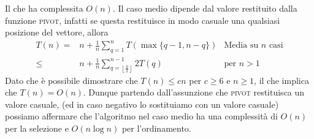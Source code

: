         Il che ha complessita $O(n)$. Il caso medio dipende dal valore restituito dalla funzione \textsc{pivot}, infatti se questa restituisce in modo casuale una qualsiasi posizione del vettore, allora
        \begin{align*}
            T(n) =& n + \frac1n\sum_{q=1}^n T(\max\{q-1,n-q\}) &\text{Media su } n \text{ casi}\\
            \leq & n + \frac1n\sum_{q=\left\lfloor \frac{n}2 \right\rfloor}^{n-1} 2T(q)  &\text{per } n>1
        \end{align*}
        Dato che è possibile dimostrare che $T(n) \leq cn$ per $c\geq 6$ e $n\geq 1$, il che implica che $T(n) = O(n)$.\newline
        Dunque partendo dall'assunzione che \textsc{pivot} restituisca un valore casuale, (ed in caso negativo lo sostituiamo con un valore casuale) possiamo affermare che l'algoritmo nel caso medio ha una complessità di $O(n)$ per la selezione e $O(n\log n)$ per l'ordinamento. 
